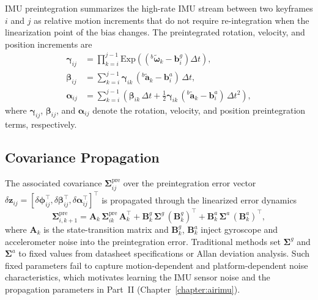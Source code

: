 IMU preintegration \cite{forster2015imu} summarizes the high-rate IMU stream between two keyframes $i$ and $j$ as relative motion increments that do not require re-integration when the linearization point of the bias changes.
The preintegrated rotation, velocity, and position increments are
\begin{equation}
\label{eq:ch2:preint}
\begin{aligned}
\bm{\gamma}_{ij} &= \prod_{k=i}^{j-1} \mathrm{Exp}\!\left(({}^{b}\tilde{\bm{\omega}}_k - \mathbf{b}^g_i)\Delta t\right), \\
\bm{\beta}_{ij} &= \sum_{k=i}^{j-1} \bm{\gamma}_{ik}\,({}^{b}\tilde{\mathbf{a}}_k - \mathbf{b}^a_i)\,\Delta t, \\
\bm{\alpha}_{ij} &= \sum_{k=i}^{j-1} \left( \bm{\beta}_{ik}\,\Delta t + \tfrac{1}{2}\bm{\gamma}_{ik}\,({}^{b}\tilde{\mathbf{a}}_k - \mathbf{b}^a_i)\,\Delta t^2 \right),
\end{aligned}
\end{equation}
where $\bm{\gamma}_{ij}$, $\bm{\beta}_{ij}$, and $\bm{\alpha}_{ij}$ denote the rotation, velocity, and position preintegration terms, respectively.

\subsection{Covariance Propagation}
\label{sec:ch2_imu_cov}

The associated covariance $\bm{\Sigma}^{\mathrm{pre}}_{ij}$ over the preintegration error vector $\delta\mathbf{z}_{ij} = [\delta\bm{\phi}_{ij}^{\top},\delta\bm{\beta}_{ij}^{\top},\delta\bm{\alpha}_{ij}^{\top}]^{\top}$ is propagated through the linearized error dynamics
\begin{equation}
\label{eq:ch2:imu_cov}
\bm{\Sigma}^{\mathrm{pre}}_{i,k+1} = \mathbf{A}_k\, \bm{\Sigma}^{\mathrm{pre}}_{ik}\, \mathbf{A}_k^{\top} + \mathbf{B}^g_k\, \bm{\Sigma}^g\, (\mathbf{B}^g_k)^{\top} + \mathbf{B}^a_k\, \bm{\Sigma}^a\, (\mathbf{B}^a_k)^{\top},
\end{equation}
where $\mathbf{A}_k$ is the state-transition matrix and $\mathbf{B}^g_k$, $\mathbf{B}^a_k$ inject gyroscope and accelerometer noise into the preintegration error.
Traditional methods set $\bm{\Sigma}^g$ and $\bm{\Sigma}^a$ to fixed values from datasheet specifications or Allan deviation analysis.
Such fixed parameters fail to capture motion-dependent and platform-dependent noise characteristics, which motivates learning the IMU sensor noise and the propagation parameters in Part~II (Chapter~\ref{chapter:airimu}).

